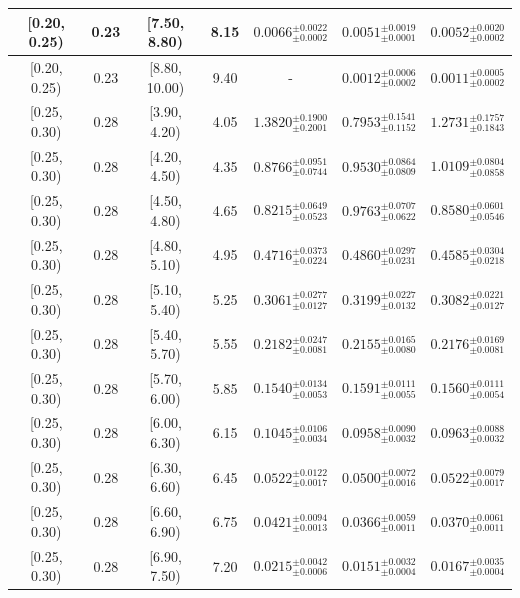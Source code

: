 \begin{longtable}{|c|c|c|c|c|c|c|}
[0.20, 0.25) & 0.23 & [7.50, 8.80) & 8.15 & $0.0066^{ \pm 0.0022 }_{ \pm 0.0002 }$ & $0.0051^{ \pm 0.0019 }_{ \pm 0.0001 }$ & $0.0052^{ \pm 0.0020 }_{ \pm 0.0002 }$ \\ 
\hline
[0.20, 0.25) & 0.23 & [8.80, 10.00) & 9.40 & - & $0.0012^{ \pm 0.0006 }_{ \pm 0.0002 }$ & $0.0011^{ \pm 0.0005 }_{ \pm 0.0002 }$ \\ 
\hline
[0.25, 0.30) & 0.28 & [3.90, 4.20) & 4.05 & $1.3820^{ \pm 0.1900 }_{ \pm 0.2001 }$ & $0.7953^{ \pm 0.1541 }_{ \pm 0.1152 }$ & $1.2731^{ \pm 0.1757 }_{ \pm 0.1843 }$ \\ 
\hline
[0.25, 0.30) & 0.28 & [4.20, 4.50) & 4.35 & $0.8766^{ \pm 0.0951 }_{ \pm 0.0744 }$ & $0.9530^{ \pm 0.0864 }_{ \pm 0.0809 }$ & $1.0109^{ \pm 0.0804 }_{ \pm 0.0858 }$ \\ 
\hline
[0.25, 0.30) & 0.28 & [4.50, 4.80) & 4.65 & $0.8215^{ \pm 0.0649 }_{ \pm 0.0523 }$ & $0.9763^{ \pm 0.0707 }_{ \pm 0.0622 }$ & $0.8580^{ \pm 0.0601 }_{ \pm 0.0546 }$ \\ 
\hline
[0.25, 0.30) & 0.28 & [4.80, 5.10) & 4.95 & $0.4716^{ \pm 0.0373 }_{ \pm 0.0224 }$ & $0.4860^{ \pm 0.0297 }_{ \pm 0.0231 }$ & $0.4585^{ \pm 0.0304 }_{ \pm 0.0218 }$ \\ 
\hline
[0.25, 0.30) & 0.28 & [5.10, 5.40) & 5.25 & $0.3061^{ \pm 0.0277 }_{ \pm 0.0127 }$ & $0.3199^{ \pm 0.0227 }_{ \pm 0.0132 }$ & $0.3082^{ \pm 0.0221 }_{ \pm 0.0127 }$ \\ 
\hline
[0.25, 0.30) & 0.28 & [5.40, 5.70) & 5.55 & $0.2182^{ \pm 0.0247 }_{ \pm 0.0081 }$ & $0.2155^{ \pm 0.0165 }_{ \pm 0.0080 }$ & $0.2176^{ \pm 0.0169 }_{ \pm 0.0081 }$ \\ 
\hline
[0.25, 0.30) & 0.28 & [5.70, 6.00) & 5.85 & $0.1540^{ \pm 0.0134 }_{ \pm 0.0053 }$ & $0.1591^{ \pm 0.0111 }_{ \pm 0.0055 }$ & $0.1560^{ \pm 0.0111 }_{ \pm 0.0054 }$ \\ 
\hline
[0.25, 0.30) & 0.28 & [6.00, 6.30) & 6.15 & $0.1045^{ \pm 0.0106 }_{ \pm 0.0034 }$ & $0.0958^{ \pm 0.0090 }_{ \pm 0.0032 }$ & $0.0963^{ \pm 0.0088 }_{ \pm 0.0032 }$ \\ 
\hline
[0.25, 0.30) & 0.28 & [6.30, 6.60) & 6.45 & $0.0522^{ \pm 0.0122 }_{ \pm 0.0017 }$ & $0.0500^{ \pm 0.0072 }_{ \pm 0.0016 }$ & $0.0522^{ \pm 0.0079 }_{ \pm 0.0017 }$ \\ 
\hline
[0.25, 0.30) & 0.28 & [6.60, 6.90) & 6.75 & $0.0421^{ \pm 0.0094 }_{ \pm 0.0013 }$ & $0.0366^{ \pm 0.0059 }_{ \pm 0.0011 }$ & $0.0370^{ \pm 0.0061 }_{ \pm 0.0011 }$ \\ 
\hline
[0.25, 0.30) & 0.28 & [6.90, 7.50) & 7.20 & $0.0215^{ \pm 0.0042 }_{ \pm 0.0006 }$ & $0.0151^{ \pm 0.0032 }_{ \pm 0.0004 }$ & $0.0167^{ \pm 0.0035 }_{ \pm 0.0004 }$ \\ 

\end{longtable}

